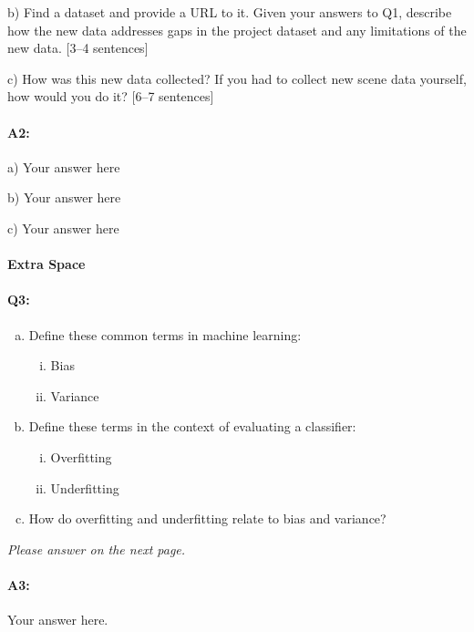 b) Find a dataset and provide a URL to it. Given your answers to Q1, describe how the new data addresses gaps in the project dataset and any limitations of the new data. [3--4 sentences] 

c) How was this new data collected? If you had to collect new scene data yourself, how would you do it? [6--7 sentences]

\paragraph{A2:} 

a) Your answer here

b) Your answer here

c) Your answer here

 

\pagebreak
\paragraph{Extra Space}
\pagebreak

\paragraph{Q3:} 

\begin{enumerate} [(a)]
    \item Define these common terms in machine learning:
    \begin{enumerate} [(i)]
    \item Bias
    \item Variance
    \end{enumerate}
    \item Define these terms in the context of evaluating a classifier:
    \begin{enumerate} [(i)]
    \item Overfitting
    \item Underfitting
    \end{enumerate}
    \item How do overfitting and underfitting relate to bias and variance?
\end{enumerate}

\emph{Please answer on the next page.}

\pagebreak
\paragraph{A3:} Your answer here.


